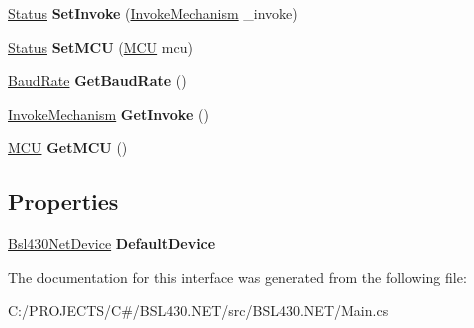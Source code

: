 \begin{DoxyCompactItemize}
\item 
\mbox{\label{interface_b_s_l430___n_e_t_1_1_main_1_1_i_device_a0a5cc0551689dde49e8dcbdc5730242b}} 
\mbox{\hyperlink{class_b_s_l430___n_e_t_1_1_status}{Status}} {\bfseries Set\+Invoke} (\mbox{\hyperlink{namespace_b_s_l430___n_e_t_a6571fdf0fbbc8408b8428f4d642c1305}{Invoke\+Mechanism}} \+\_\+invoke)
\item 
\mbox{\label{interface_b_s_l430___n_e_t_1_1_main_1_1_i_device_a21f1e2910d10429b802218e56afadc70}} 
\mbox{\hyperlink{class_b_s_l430___n_e_t_1_1_status}{Status}} {\bfseries Set\+M\+CU} (\mbox{\hyperlink{namespace_b_s_l430___n_e_t_a2cdaa65be7e1679fc8ca77610b19a490}{M\+CU}} mcu)
\item 
\mbox{\label{interface_b_s_l430___n_e_t_1_1_main_1_1_i_device_abcf169df1c164f44211196b82490a724}} 
\mbox{\hyperlink{namespace_b_s_l430___n_e_t_a8d30c263598635a481840944d38aeb70}{Baud\+Rate}} {\bfseries Get\+Baud\+Rate} ()
\item 
\mbox{\label{interface_b_s_l430___n_e_t_1_1_main_1_1_i_device_a9b1e7a28bb8cc3d7aa90fbeb336fedcb}} 
\mbox{\hyperlink{namespace_b_s_l430___n_e_t_a6571fdf0fbbc8408b8428f4d642c1305}{Invoke\+Mechanism}} {\bfseries Get\+Invoke} ()
\item 
\mbox{\label{interface_b_s_l430___n_e_t_1_1_main_1_1_i_device_a6b6061d578e2a6e2a606cb181d6708b7}} 
\mbox{\hyperlink{namespace_b_s_l430___n_e_t_a2cdaa65be7e1679fc8ca77610b19a490}{M\+CU}} {\bfseries Get\+M\+CU} ()
\end{DoxyCompactItemize}
\subsection*{Properties}
\begin{DoxyCompactItemize}
\item 
\mbox{\label{interface_b_s_l430___n_e_t_1_1_main_1_1_i_device_aa6a8519a97820c39ab769f24b3f4f112}} 
\mbox{\hyperlink{class_b_s_l430___n_e_t_1_1_bsl430_net_device}{Bsl430\+Net\+Device}} {\bfseries Default\+Device}
\end{DoxyCompactItemize}


The documentation for this interface was generated from the following file\+:\begin{DoxyCompactItemize}
\item 
C\+:/\+P\+R\+O\+J\+E\+C\+T\+S/\+C\#/\+B\+S\+L430.\+N\+E\+T/src/\+B\+S\+L430.\+N\+E\+T/Main.\+cs\end{DoxyCompactItemize}
